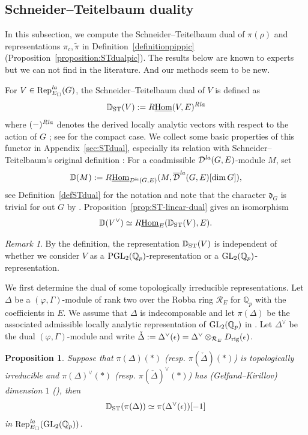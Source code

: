 \documentclass[a4paper,10pt]{amsart}
\theoremstyle{remark}
\newtheorem{remark}[theorem]{Remark}
\theoremstyle{definition}
\theoremstyle{plain}
\newtheorem{proposition}[theorem]{Proposition}
\numberwithin{equation}{section}
\newcommand{\bbD}{{\mathbb D}}
\newcommand{\bbQ}{{\mathbb Q}}
\newcommand{\calD}{{\mathcal D}}
\newcommand{\calR}{{\mathcal R}}
\newcommand{\GL}{{\rm GL}}
\newcommand{\Hom}{{\rm Hom}}
\newcommand{\uHom}{\underline{\Hom}}
\newcommand{\la}{{\it la}}
\newcommand{\PGL}{{\rm PGL}}
\newcommand{\Rep}{{\rm Rep}}
\newcommand{\ST}{{\rm ST}}
\begin{document}
\subsection{Schneider--Teitelbaum duality}\label{subsectionSTdual}
In this subsection, we compute the Schneider--Teitelbaum dual of $\pi(\rho)$ and representations $\pi_c,\widetilde{\pi}$ in Definition~\ref{definitionpippic} (Proposition~\ref{proposition:STdualpic}). The results below are known to experts but we can not find in the literature. And our methods seem to be new.

For $V\in\Rep^{\la}_{E_\square}(G)$, the Schneider--Teitelbaum dual of $V$ is defined as 
\[\bbD_{\ST}(V):=R\uHom(V,E)^{R\la}\] 
where $(-)^{R\la}$ denotes the derived locally analytic vectors with respect to the action of $G$ \cite[Def.~4.40]{rodrigues2022solid}; see \cite[Prop.~4.2.7]{JC23} for the compact case. We collect some basic properties of this functor in Appendix~\ref{sec:STdual}, especially its relation with Schneider--Teitelbaum's original definition \cite{ST05}: For a coadmissible $\calD^{\la}(G,E)$-module $M$, set
\[\bbD(M):=R\uHom_{\calD^{\la}(G,E)}(M,\overline{\calD}^{\la}(G,E)[\dim G]),\]
see Definition~\ref{defSTdual} for the notation and note that the character $\mathfrak d_G$ is trivial for out $G$ by \cite[Rem.~3.4]{ST05}. Proposition~\ref{prop:ST-linear-dual} gives an isomorphism 
\[ \bbD(V^{\vee})\simeq R\uHom_E(\bbD_{\ST}(V),E).\]
\begin{remark}\label{remarSTdualindependent}
	By the definition, the representation $\bbD_{\rm ST}(V)$ is independent of whether we consider $V$ as a $\PGL_2(\bbQ_p)$-representation or a $\GL_2(\bbQ_p)$-representation.
\end{remark}
We first determine the dual of some topologically irreducible representations. Let $\Delta$ be a $(\varphi,\Gamma)$-module of rank two over the Robba ring $\calR_E$ for $\bbQ_p$ with the coefficients in $E$. We assume that $\Delta$ is indecomposable and let $\pi(\Delta)$ be the associated admissible locally analytic representation of $\GL_2(\bbQ_p)$ in \cite[Thm.~0.1]{colmez2016representations}. Let $\Delta^{\vee}$ be the dual $(\varphi,\Gamma)$-module and write $\check\Delta:=\Delta^{\vee}(\epsilon)=\Delta^{\vee}\otimes_{\calR_E}D_{\rm rig}(\epsilon)$. 
\begin{proposition}\label{propositionSTselfdual}
	Suppose that $\pi(\Delta)(*)$ (resp. $\pi(\check\Delta)(*)$) is topologically irreducible and $\pi(\Delta)^{\vee}(*)$ (resp. $\pi(\check\Delta)^{\vee}(*)$) has (Gelfand--Kirillov) dimension $1$ (\cite[\S~8]{ST03}), then 
	\[\bbD_{\ST}(\pi(\Delta))\simeq \pi(\Delta^{\vee}(\epsilon))[-1]\]
	in $\Rep^{\la}_{E_\square}(\GL_2(\bbQ_p))$.
\end{proposition}
\end{document}
